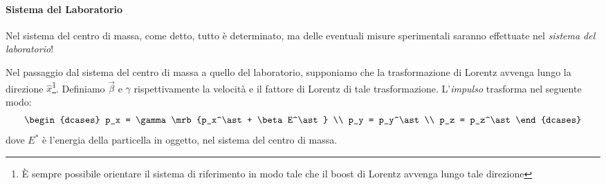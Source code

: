 \paragraph{Sistema del Laboratorio}
Nel sistema del centro di massa, come detto, tutto è determinato, ma delle
eventuali misure sperimentali saranno effettuate nel \textit{sistema del
	laboratorio}!

Nel passaggio dal sistema del centro di massa a quello del laboratorio,
supponiamo che la trasformazione di Lorentz avvenga lungo la direzione
$\hat{x}$\footnote{
	È sempre possibile orientare il sistema di riferimento in modo tale che il
	boost di Lorentz avvenga lungo tale direzione
}. Definiamo $\vec{\beta}$ e $\gamma$ rispettivamente la velocità e il
fattore di Lorentz di tale trasformazione. L'\textit{impulso} trasforma nel
seguente modo:
\begin{equation}
	\begin{dcases}
		p_x = \gamma\mrb{p_x^\ast + \beta E^\ast}
		\\
		p_y = p_y^\ast
		\\
		p_z = p_z^\ast
	\end{dcases}
\end{equation}
dove $E^\ast$ è l'energia della particella in oggetto, nel sistema del centro
di massa.

